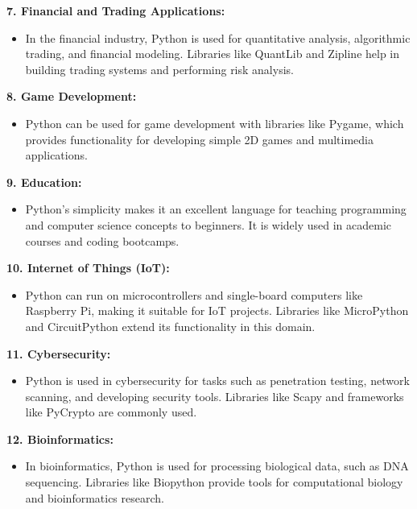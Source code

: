 \documentclass[12pt]{article}
\begin{document}
\textbf{7. Financial and Trading Applications:}
\begin{itemize}
    \item In the financial industry, Python is used for quantitative analysis, algorithmic trading, and financial modeling. Libraries like QuantLib and Zipline help in building trading systems and performing risk analysis.
\end{itemize}

\textbf{8. Game Development:}
\begin{itemize}
    \item Python can be used for game development with libraries like Pygame, which provides functionality for developing simple 2D games and multimedia applications.
\end{itemize}

\textbf{9. Education:}
\begin{itemize}
    \item Python’s simplicity makes it an excellent language for teaching programming and computer science concepts to beginners. It is widely used in academic courses and coding bootcamps.
\end{itemize}

\textbf{10. Internet of Things (IoT):}
\begin{itemize}
    \item Python can run on microcontrollers and single-board computers like Raspberry Pi, making it suitable for IoT projects. Libraries like MicroPython and CircuitPython extend its functionality in this domain.
\end{itemize}

\textbf{11. Cybersecurity:}
\begin{itemize}
    \item Python is used in cybersecurity for tasks such as penetration testing, network scanning, and developing security tools. Libraries like Scapy and frameworks like PyCrypto are commonly used.
\end{itemize}

\textbf{12. Bioinformatics:}
\begin{itemize}
    \item In bioinformatics, Python is used for processing biological data, such as DNA sequencing. Libraries like Biopython provide tools for computational biology and bioinformatics research.
\end{itemize}
\end{document}
